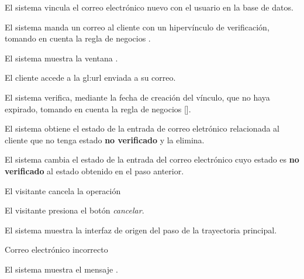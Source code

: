 {\begin{trayectoriaPrincipal}
    \item El sistema vincula el correo electrónico nuevo con el usuario en la
      base de datos.

    \item El sistema manda un correo al cliente con un hipervínculo de
      verificación, tomando en cuenta la regla de negocios
      .

    \item El sistema muestra la ventana
      .

    \item El cliente accede a la \gls{gl:url} enviada a su correo.

    \item El sistema verifica, mediante la fecha de creación del vínculo, que no
      haya expirado, tomando en cuenta la regla de negocios
      [].

    \item El sistema obtiene el estado de la entrada de correo eletrónico
      relacionada al cliente que no tenga estado \textbf{no verificado} y la
      elimina.

    \item El sistema cambia el estado de la entrada del correo electrónico cuyo
      estado es \textbf{no verificado} al estado obtenido en el paso anterior.

  \end{trayectoriaPrincipal}

  \begin{trayectoriaAlternativa}[ta:cancelar]
    {El visitante cancela la operación}

    \item El visitante presiona el botón \textit{cancelar}.

    \item El sistema muestra la interfaz de origen del paso
       de la trayectoria principal.

  \end{trayectoriaAlternativa}

  \begin{trayectoriaAlternativa}
    {Correo electrónico incorrecto}

    \item El sistema muestra el mensaje .


\end{trayectoriaAlternativa}}
